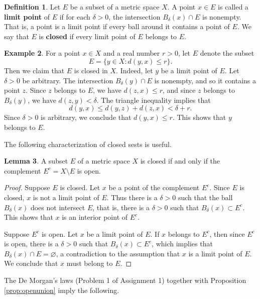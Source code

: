 \documentclass[12pt]{article}
\theoremstyle{definition}
\newtheorem{definition}{Definition}
\newtheorem{example}[definition]{Example}
\theoremstyle{theorem}
\newtheorem{lemma}[definition]{Lemma}
\begin{document}
\begin{definition}
Let $E$ be a subset of a metric space $X$. A point $x \in E$ is called a \textbf{limit point} of $E$ if for each $\delta > 0$, the intersection $B_\delta(x) \cap E$ is nonempty. That is, a point is a limit point if every ball around it contains a point of $E$. We say that $E$ is \textbf{closed} if every limit point of $E$ belongs to $E$. 
\end{definition}

\begin{example}
For a point $x \in X$ and a real number $r > 0$, let $E$ denote the subset
\[
E = \{y \in X: d(y,x) \leqslant r\}.
\]
Then we claim that $E$ is closed in $X$. Indeed, let $y$ be a limit point of $E$. Let $\delta > 0$ be arbitrary. The intersection $B_\delta(y) \cap E$ is nonempty, and so it contains a point $z$. Since $z$ belongs to $E$, we have $d(z,x) \leqslant r$, and since $z$ belongs to $B_\delta(y)$, we have $d(z,y) < \delta$. The triangle inequality implies that  
\[
d(y,x) \leqslant d(y,z) + d(z,x) < \delta + r.
\]
Since $\delta > 0$ is arbitrary, we conclude that $d(y,x) \leqslant r$. This shows that $y$ belongs to $E$. 
\end{example}

The following characterization of closed sests is useful. 

\begin{lemma}
A subset $E$ of a metric space $X$ is closed if and only if the complement $E^c = X \setminus E$ is open. 
\end{lemma}

\begin{proof}
Suppose $E$ is closed. Let $x$ be a point of the complement $E^c$. Since $E$ is closed, $x$ is not a limit point of $E$. Thus there is a $\delta > 0$ such that the ball $B_\delta(x)$ does not intersect $E$, that is, there is a $\delta > 0$ such that $B_\delta(x) \subset E^c$. This shows that $x$ is an interior point of $E^c$. 

Suppose $E^c$ is open. Let $x$ be a limit point of $E$. If $x$ belongs to $E^c$, then since $E^c$ is open, there is a $\delta > 0$ such that $B_\delta(x) \subset E^c$, which implies that $B_\delta(x) \cap E = \varnothing$, a contradiction to the assumption that $x$ is a limit point of $E$. We conclude that $x$ must belong to $E$. 
\end{proof}

The De Morgan's laws (Problem 1 of Assignment 1) together with Proposition \ref{prop:openunion} imply the following. 
\end{document}
